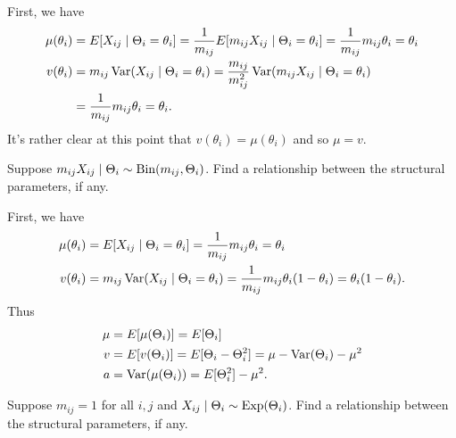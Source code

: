 \documentclass[notoc,notitlepage]{tufte-book}
\begin{document}
\begin{solution}
  First, we have
  \begin{align*}
    \mu(\theta_i) &= E[X_{ij} \mid \Theta_i = \theta_i]
           = \frac{1}{m_{ij}} E [m_{ij} X_{ij} \mid \Theta_i = \theta_i]
           = \frac{1}{m_{ij}} m_{ij} \theta_i = \theta_i \\
    v(\theta_i) &= m_{ij} \operatorname{Var}(X_{ij} \mid \Theta_i = \theta_i)
           = \frac{m_{ij}}{m_{ij}^2} \operatorname{Var}(m_{ij}X_{ij}
             \mid \Theta_i = \theta_i) \\
          &= \frac{1}{m_{ij}} m_{ij} \theta_i = \theta_i.
  \end{align*}
  It's rather clear at this point that $v(\theta_i) = \mu(\theta_i)$
  and so $\mu = v$.
\end{solution}

\begin{eg}
  Suppose $m_{ij} X_{ij} \mid \Theta_i \sim \operatorname{Bin}(m_{ij}, \Theta_i)$.
  Find a relationship between the structural parameters, if any.
\end{eg}

\begin{solution}
  First, we have
  \begin{align*}
    \mu(\theta_i) &= E[X_{ij} \mid \Theta_i = \theta_i]
           = \frac{1}{m_{ij}} m_{ij} \theta_i = \theta_i \\
    v(\theta_i) &= m_{ij} \operatorname{Var}(X_{ij} \mid \Theta_i = \theta_i)
           = \frac{1}{m_{ij}} m_{ij} \theta_i (1 - \theta_i)
           = \theta_i (1 - \theta_i).
  \end{align*}
  Thus
  \begin{align*}
    \mu &= E[\mu(\Theta_i)] = E[\Theta_i] \\
    v &= E[v(\Theta_i)] = E[\Theta_i - \Theta_i^2] = \mu - \operatorname{Var}(\Theta_i) -
        \mu^2 \\
    a &= \operatorname{Var}(\mu(\Theta_i)) = E[\Theta_i^2] - \mu^2.
  \end{align*}
\end{solution}

\begin{eg}
  Suppose $m_{ij} = 1$ for all $i, j$
  and $X_{ij} \mid \Theta_i \sim \operatorname{Exp}(\Theta_i)$.
  Find a relationship between the structural parameters, if any.
\end{eg}
\end{document}
